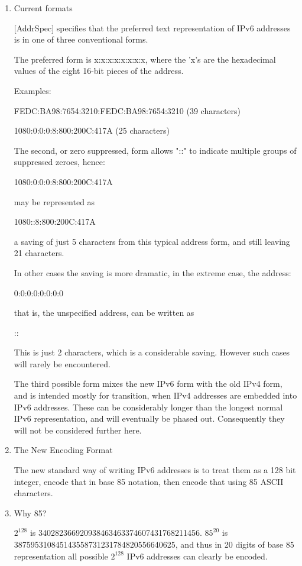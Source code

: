\documentclass{article}
\begin{document}
\begin{enumerate}
\item Current formats

   [AddrSpec] specifies that the preferred text representation of IPv6
   addresses is in one of three conventional forms.

   The preferred form is x:x:x:x:x:x:x:x, where the 'x's are the
   hexadecimal values of the eight 16-bit pieces of the address.

   Examples:

        FEDC:BA98:7654:3210:FEDC:BA98:7654:3210  (39 characters)

        1080:0:0:0:8:800:200C:417A  (25 characters)

   The second, or zero suppressed, form allows "::" to indicate multiple
   groups of suppressed zeroes, hence:

        1080:0:0:0:8:800:200C:417A

   may be represented as

        1080::8:800:200C:417A

   a saving of just 5 characters from this typical address form, and
   still leaving 21 characters.

   In other cases the saving is more dramatic, in the extreme case, the
   address:

        0:0:0:0:0:0:0:0

   that is, the unspecified address, can be written as

        ::

   This is just 2 characters, which is a considerable saving.  However
   such cases will rarely be encountered.


   The third possible form mixes the new IPv6 form with the old IPv4
   form, and is intended mostly for transition, when IPv4 addresses are
   embedded into IPv6 addresses.  These can be considerably longer than
   the longest normal IPv6 representation, and will eventually be phased
   out.  Consequently they will not be considered further here.

\item The New Encoding Format

   The new standard way of writing IPv6 addresses is to treat them as a
   128 bit integer, encode that in base 85 notation, then encode that
   using 85 ASCII characters.

\item Why 85?

   $2^{128}$ is 340282366920938463463374607431768211456.  $85^{20}$ is
   \\387595310845143558731231784820556640625, and thus in 20 digits of
   base 85 representation all possible $2^{128}$ IPv6 addresses can clearly
   be encoded.


\end{enumerate}
\end{document}
